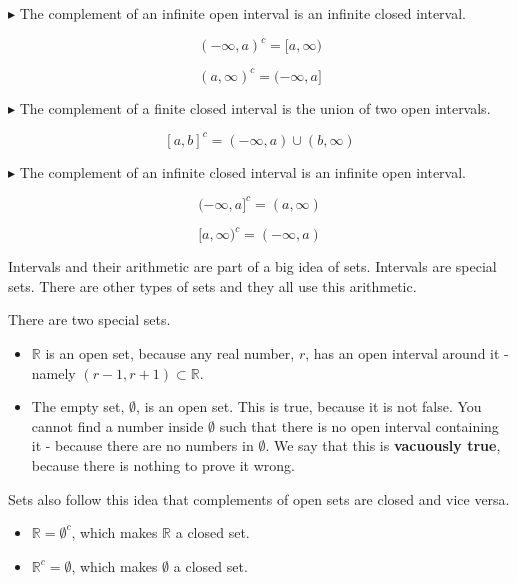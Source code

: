 \documentclass{ximera}
\begin{document}
$\blacktriangleright$ The complement of an infinite open interval is an infinite closed interval.

\[     (-\infty, a)^{c} = [a, \infty)          \]

\[     (a, \infty)^{c} = (-\infty, a]          \]



$\blacktriangleright$ The complement of a finite closed interval is the union of two open intervals.

\[    [a,b]^{c}  = (-\infty, a) \cup (b, \infty)          \]



$\blacktriangleright$ The complement of an infinite closed interval is an infinite open interval.

\[     (-\infty, a]^{c} = (a, \infty)          \]

\[     [a, \infty)^{c} = (-\infty, a)          \]









Intervals and their arithmetic are part of a big idea of sets.  Intervals are special sets.  There are other types of sets and they all use this arithmetic.

There are two special sets.

\begin{itemize}
\item $\mathbb{R}$  is an open set, because any real number, $r$, has an open interval around it - namely $(r-1, r+1) \subset \mathbb{R}$.
\item The empty set, $\emptyset$, is an open set.  This is true, because it is not false.  You cannot find a number inside $\emptyset$ such that there is no open interval containing it - because there are no numbers in $\emptyset$.  We say that this is \textbf{vacuously true}, because there is nothing to prove it wrong.
\end{itemize}





Sets also follow this idea that complements of open sets are closed and vice versa.

\begin{itemize}
\item $\mathbb{R} = \emptyset^c$, which makes $\mathbb{R}$ a closed set.
\item $\mathbb{R}^c = \emptyset$, which makes $\emptyset$ a closed set.
\end{itemize}
\end{document}
